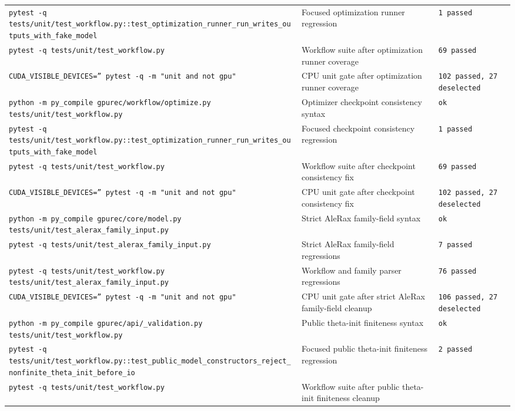 \documentclass[11pt]{article}
\begin{document}
\begin{center}
\begin{tabular}{lll}
\texttt{pytest -q tests/unit/test\_workflow.py::test\_optimization\_runner\_run\_writes\_outputs\_with\_fake\_model} &
Focused optimization runner regression &
\texttt{1 passed} \\
\texttt{pytest -q tests/unit/test\_workflow.py} &
Workflow suite after optimization runner coverage &
\texttt{69 passed} \\
\texttt{CUDA\_VISIBLE\_DEVICES='' pytest -q -m "unit and not gpu"} &
CPU unit gate after optimization runner coverage &
\texttt{102 passed, 27 deselected} \\
\texttt{python -m py\_compile gpurec/workflow/optimize.py tests/unit/test\_workflow.py} &
Optimizer checkpoint consistency syntax &
\texttt{ok} \\
\texttt{pytest -q tests/unit/test\_workflow.py::test\_optimization\_runner\_run\_writes\_outputs\_with\_fake\_model} &
Focused checkpoint consistency regression &
\texttt{1 passed} \\
\texttt{pytest -q tests/unit/test\_workflow.py} &
Workflow suite after checkpoint consistency fix &
\texttt{69 passed} \\
\texttt{CUDA\_VISIBLE\_DEVICES='' pytest -q -m "unit and not gpu"} &
CPU unit gate after checkpoint consistency fix &
\texttt{102 passed, 27 deselected} \\
\texttt{python -m py\_compile gpurec/core/model.py tests/unit/test\_alerax\_family\_input.py} &
Strict AleRax family-field syntax &
\texttt{ok} \\
\texttt{pytest -q tests/unit/test\_alerax\_family\_input.py} &
Strict AleRax family-field regressions &
\texttt{7 passed} \\
\texttt{pytest -q tests/unit/test\_workflow.py tests/unit/test\_alerax\_family\_input.py} &
Workflow and family parser regressions &
\texttt{76 passed} \\
\texttt{CUDA\_VISIBLE\_DEVICES='' pytest -q -m "unit and not gpu"} &
CPU unit gate after strict AleRax family-field cleanup &
\texttt{106 passed, 27 deselected} \\
\texttt{python -m py\_compile gpurec/api/\_validation.py tests/unit/test\_workflow.py} &
Public theta-init finiteness syntax &
\texttt{ok} \\
\texttt{pytest -q tests/unit/test\_workflow.py::test\_public\_model\_constructors\_reject\_nonfinite\_theta\_init\_before\_io} &
Focused public theta-init finiteness regression &
\texttt{2 passed} \\
\texttt{pytest -q tests/unit/test\_workflow.py} &
Workflow suite after public theta-init finiteness cleanup &

\end{tabular}
\end{center}
\end{document}
